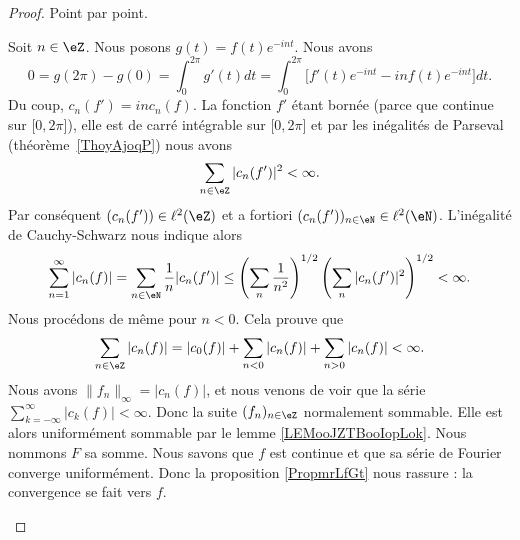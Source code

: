 \begin{proof}
	Point par point.
	\begin{subproof}
		Soit \( n\in \eZ\). Nous posons \( g(t)=f(t) e^{-int}\). Nous avons
		\begin{equation}
			0=g(2\pi)-g(0)=\int_0^{2\pi}g'(t)dt=\int_0^{2\pi}\big[ f'(t) e^{-int}-inf(t) e^{-int} \big]dt.
		\end{equation}
		Du coup, \( c_n(f')=inc_n(f)\). La fonction \( f'\) étant bornée (parce que continue sur \( \mathopen[ 0 , 2\pi \mathclose]\)), elle est de carré intégrable sur \( \mathopen[ 0 , 2\pi \mathclose]\) et par les inégalités de Parseval (théorème~\ref{ThoyAjoqP}) nous avons
		\begin{equation}
			\sum_{n\in \eZ}| c_n(f') |^2<\infty.
		\end{equation}
		Par conséquent \( (c_n(f'))\in \ell^2(\eZ)\) et a fortiori \( (c_n(f'))_{n\in \eN}\in \ell^2(\eN)\). L'inégalité de Cauchy-Schwarz nous indique alors
		\begin{equation}
			\sum_{n=1}^{\infty}| c_n(f) |=\sum_{n\in \eN}\frac{1}{ n }| c_n(f') |\leq \left( \sum_n\frac{1}{ n^2 } \right)^{1/2}\left( \sum_{n}| c_n(f') |^2 \right)^{1/2}<\infty.
		\end{equation}
		Nous procédons de même pour \( n<0\). Cela prouve que
		\begin{equation}
			\sum_{n\in \eZ}| c_n(f) | = |c_0(f)|+\sum_{n<0}| c_n(f) |+\sum_{n>0} | c_n(f) |  <\infty.
		\end{equation}
		Nous avons \( \| f_n \|_{\infty}=| c_n(f) |\), et nous venons de voir que la série \( \sum_{k=-\infty}^{\infty}| c_k(f) |<\infty\). Donc la suite \( (f_n)_{n\in \eZ}\) normalement sommable. Elle est alors uniformément sommable par le lemme \ref{LEMooJZTBooIopLok}. Nous nommons \( F\) sa somme.
		Nous savons que \( f\) est continue et que sa série de Fourier converge uniformément. Donc la proposition \ref{PropmrLfGt} nous rassure : la convergence se fait vers \( f\).
	\end{subproof}
\end{proof}

